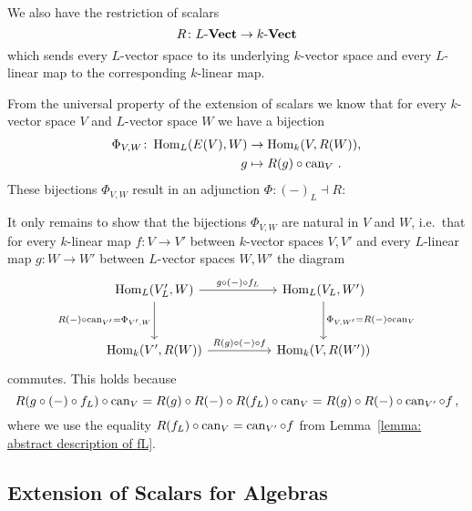 \begin{remark}
  \label{remark: adjointness of extension and restriction}
  We also have the restriction of scalars
  \[
            R
    \colon  L\text{-}\mathbf{Vect}
    \to     k\text{-}\mathbf{Vect}
  \]
  which sends every $L$-vector space to its underlying $k$-vector space and every $L$-linear map to the corresponding $k$-linear map.
    
  From the universal property of the extension of scalars we know that for every $k$-vector space $V$ and $L$-vector space $W$ we have a bijection
  \begin{align*}
              \Phi_{V,W}
     \colon   \operatorname{Hom}_L(E(V),W)
    &\to      \operatorname{Hom}_k(V,R(W)), \\
              g
    &\mapsto  R(g) \circ \operatorname{can}_V \,.
  \end{align*}
  These bijections $\Phi_{V,W}$ result in an adjunction $\Phi \colon (-)_L \dashv R$:
  
  It only remains to show that the bijections $\Phi_{V,W}$ are natural in $V$ and $W$, i.e.\ that for every $k$-linear map $f \colon V \to V'$ between $k$-vector spaces $V, V'$ and every $L$-linear map $g \colon W \to W'$ between $L$-vector spaces $W, W'$ the diagram
  \[
    \begin{tikzcd}[row sep = 3em, column sep = 5em]
        \Hom_L(V'_L, W)
        \arrow{r}[above]{g \circ (-) \circ f_L}
        \arrow{d}[left]{R(-) \circ \can_{V'} = \Phi_{V',W}}
      & \Hom_L(V_L, W')
        \arrow{d}[right]{\Phi_{V,W'} = R(-) \circ \can_V}
      \\
        \Hom_k(V', R(W))
        \arrow{r}[above]{R(g) \circ (-) \circ f}
      & \Hom_k(V, R(W'))
    \end{tikzcd}
  \]
  commutes.
  This holds because
  \[
      R(g \circ (-) \circ f_L) \circ \operatorname{can}_V
    = R(g) \circ R(-) \circ R(f_L) \circ \operatorname{can}_V
    = R(g) \circ R(-) \circ \operatorname{can}_{V'} \circ f \,,
  \]
  where we use the equality $R(f_L) \circ \operatorname{can}_V = \operatorname{can}_{V'} \circ f$ from Lemma~\ref{lemma: abstract description of fL}.
\end{remark}





\subsection{Extension of Scalars for Algebras}

